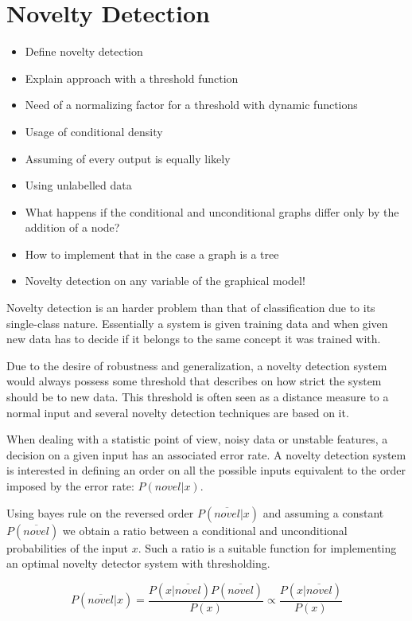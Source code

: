 \documentclass[runningheads,a4paper]{llncs}
\begin{document}
\section{Novelty Detection}
\begin{itemize}
\item Define novelty detection 
\item Explain approach with a threshold function
\item Need of a normalizing factor for a threshold with dynamic functions
\item Usage of conditional density
\item Assuming of every output is equally likely
\item Using unlabelled data
\item What happens if the conditional and unconditional graphs differ only by the addition of a node?
\item How to implement that in the case a graph is a tree
\item Novelty detection on any variable of the graphical model!
\end{itemize}

Novelty detection is an harder problem than that of classification due to its single-class nature.
Essentially a system is given training data and when given new data has to decide if it belongs
to the same concept it was trained with.

Due to the desire of robustness and generalization, a novelty detection system would always possess
some threshold that describes on how strict the system should be to new data.
This threshold is often seen as a distance measure to a normal input and several novelty detection
techniques are based on it.

When dealing with a statistic point of view, noisy data or unstable features, a decision on a
given input has an associated error rate. A novelty detection system is interested in defining an
order on all the possible inputs equivalent to the order imposed by the error rate: $P(novel|x)$.

Using bayes rule on the reversed order $P(\overline{novel}|x)$ and assuming a constant $P(\overline{novel})$
we obtain a ratio between a conditional and unconditional probabilities of the input $x$.
Such a ratio is a suitable function for implementing an optimal novelty detector system with
thresholding.

\begin{equation}
\label{eq:novelty-threshold}
          P(\overline{novel}|x)
  =       \frac{P(x|\overline{novel}) P(\overline{novel})}{P(x)}
  \propto \frac{P(x|\overline{novel})}{P(x)}
\end{equation}
\end{document}
